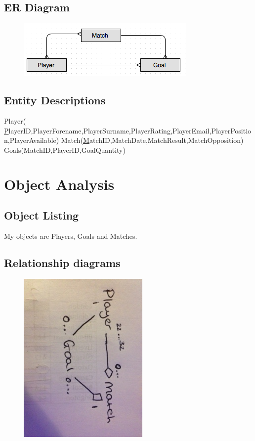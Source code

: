 \subsection{ER Diagram}
\begin{figure}[H]
	\includegraphics{ER}
\end{figure}

\subsection{Entity Descriptions}
Player( {\ul PlayerID},PlayerForename,PlayerSurname,PlayerRating,PlayerEmail,PlayerPosition,PlayerAvailable)
Match({\ul MatchID},MatchDate,MatchResult,MatchOpposition)
Goals(MatchID,PlayerID,GoalQuantity)
\section{Object Analysis}

\subsection{Object Listing}
 My objects are Players, Goals and Matches. 
\subsection{Relationship diagrams}
\begin{figure}[H]
	\includegraphics{classdiagram}
\end{figure}

